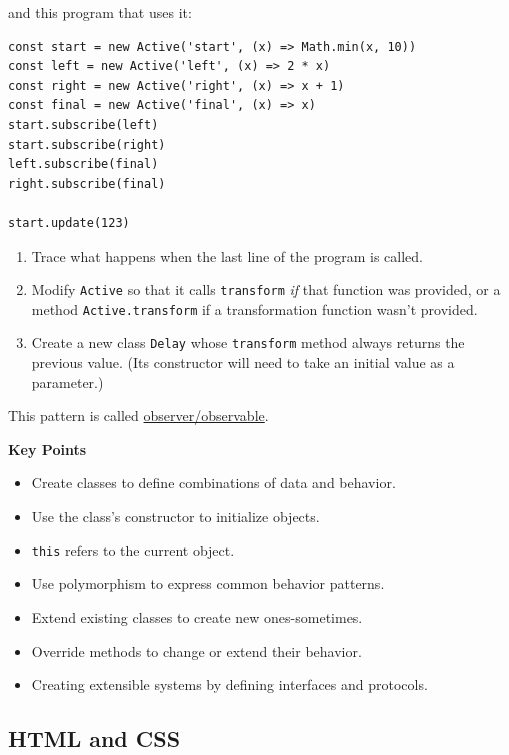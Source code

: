 and this program that uses it:

\begin{verbatim}
const start = new Active('start', (x) => Math.min(x, 10))
const left = new Active('left', (x) => 2 * x)
const right = new Active('right', (x) => x + 1)
const final = new Active('final', (x) => x)
start.subscribe(left)
start.subscribe(right)
left.subscribe(final)
right.subscribe(final)

start.update(123)
\end{verbatim}

\begin{enumerate}
\tightlist
\item
  Trace what happens when the last line of the program is called.
\item
  Modify \texttt{Active} so that it calls \texttt{transform} \emph{if}
  that function was provided, or a method \texttt{Active.transform} if a
  transformation function wasn't provided.
\item
  Create a new class \texttt{Delay} whose \texttt{transform} method
  always returns the previous value. (Its constructor will need to take
  an initial value as a parameter.)
\end{enumerate}

This pattern is called
\protect\hyperlink{g:observer-observable}{observer/observable}.

\textbf{Key Points}

\begin{itemize}
\tightlist
\item
  Create classes to define combinations of data and behavior.
\item
  Use the class's constructor to initialize objects.
\item
  \texttt{this} refers to the current object.
\item
  Use polymorphism to express common behavior patterns.
\item
  Extend existing classes to create new ones-sometimes.
\item
  Override methods to change or extend their behavior.
\item
  Creating extensible systems by defining interfaces and protocols.
\end{itemize}

\hypertarget{s:htmlcss}{\subsection{HTML and CSS}\label{s:htmlcss}}

